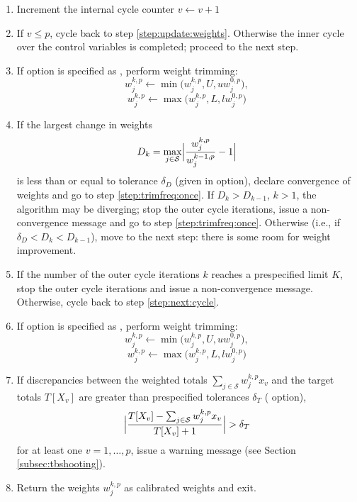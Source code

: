 \begin{enumerate}
        \label{step:trimfreq:often}
    \item Increment the internal cycle counter $v \leftarrow v+1$
    \item If $v \le p$, cycle back to step \ref{step:update:weights}.
        Otherwise the inner cycle over the control variables is completed; proceed to the next step.
    \item If  option is specified as ,
        perform weight trimming:
        $$
            w_j^{k,p} \leftarrow \min\bigl( w_j^{k,p}, U, u w_j^{0,p} \bigr),
        $$
        $$
            w_j^{k,p} \leftarrow \max\bigl( w_j^{k,p}, L, l w_j^{0,p} \bigr)
        $$
        \label{step:trimfreq:sometimes}
    \item If the largest change in weights
        $$
            D_k = \max_{j \in \mathcal{S}}
                \Bigl| \frac{w_j^{k,p}}{w_j^{k-1,p}} - 1 \Bigr|
        $$
        is less than or equal to tolerance $\delta_D$ (given in  option),
        declare convergence of weights and go to step \ref{step:trimfreq:once}. 
        If $D_k > D_{k-1}$, $k>1$, the algorithm
        may be diverging; stop the outer cycle iterations, issue a non-convergence
        message and go to step \ref{step:trimfreq:once}. Otherwise
        (i.e., if $\delta_D < D_k < D_{k-1}$), move to the next step:
        there is some room for weight improvement.
        \label{step:check:weight:conv}
    \item If the number of the outer cycle iterations $k$ reaches a prespecified limit $K$,
          stop the outer cycle iterations and issue a non-convergence message. 
          Otherwise, cycle back to step \ref{step:next:cycle}.
    \item If  option is specified as ,
        perform weight trimming:
        $$
            w_j^{k,p} \leftarrow \min\bigl( w_j^{k,p}, U, u w_j^{0,p} \bigr),
        $$
        $$
            w_j^{k,p} \leftarrow \max\bigl( w_j^{k,p}, L, l w_j^{0,p} \bigr)
        $$
        \label{step:trimfreq:once}
    \item If discrepancies between the weighted totals
        $\sum_{j \in \mathcal{S}} w_j^{k,p} x_v$
        and the target totals $T[X_v]$ are greater than
        prespecified tolerances $\delta_T$ ( option),
        $$
            \Bigl| \frac{ T[X_v] - \sum_{j \in \mathcal{S}} w_j^{k,p} x_v }%
                        {T[X_v]+1} \Bigr| > \delta_T
        $$
        for at least one $v=1,\ldots,p$,
        issue a warning message (see Section \ref{subsec:tbshooting}).
        \label{step:check:ctotal:conv}
    \item Return the weights $w_j^{k,p}$ as calibrated weights and exit.
\end{enumerate}

